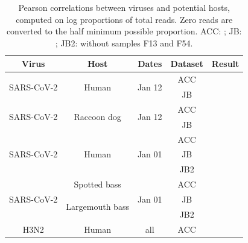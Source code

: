 \documentclass[11pt]{article}
\def \sct {\mbox{SARS-CoV-2}}
\begin{document}
\begin{table}[h!]
{\small
\def \sepline {0.75em}
\begin{tabular}{c  c  c  c  l}
\bf Virus & \bf Host & \bf Dates & \bf Dataset & \bf Result \\ \hline
\multirow{2}{*}{\sct{}} & \multirow{2}{*}{Human} & \multirow{2}{*}{Jan 12} & ACC & \ACCTwelfthSCHS{} \\
&&& JB &  \JBTwelfthSCHS{} \\[\sepline]
\multirow{2}{*}{\sct{}} & \multirow{2}{*}{Raccoon dog} & \multirow{2}{*}{Jan 12} & ACC & \ACCTwelfthSCRD{} \\
&&& JB &  \JBTwelfthSCRD{} \\[\sepline]
\multirow{3}{*}{\sct{}} & \multirow{3}{*}{Human} & \multirow{3}{*}{Jan 01} & ACC & \ACCFirstSCHS{} \\
&&& JB &  \JBFirstSCHS{} \\
&&& JB2 &  \JBFirstSCHStwo{} \\[\sepline]
%
\multirow{3}{*}{\sct{}} & Spotted bass& \multirow{3}{*}{Jan 01} & ACC & \ACCFirstSCSB{} \\
& \multirow{2}{*}{Largemouth bass} && JB &  \JBFirstSCLB{} \\
& && JB2 &  \JBFirstSCLBtwo{} \\
[\sepline]
\multirow{1}{*}{H3N2} & \multirow{1}{*}{Human} & \multirow{1}{*}{all} & ACC & \ACCAllHNHS{} \\[\sepline] %
\end{tabular}
}
\caption{Pearson correlations between viruses and potential hosts, computed on log proportions of total reads. Zero reads are converted to the half minimum possible proportion. ACC: \citet{ACC2023bioRxiv}; JB: \citet{Bloom2023VE}; JB2:  \citet{Bloom2023VE} without samples F13 and F54. }
\label{tab:summarycor}
\end{table}

\clearpage



\clearpage
\end{document}

